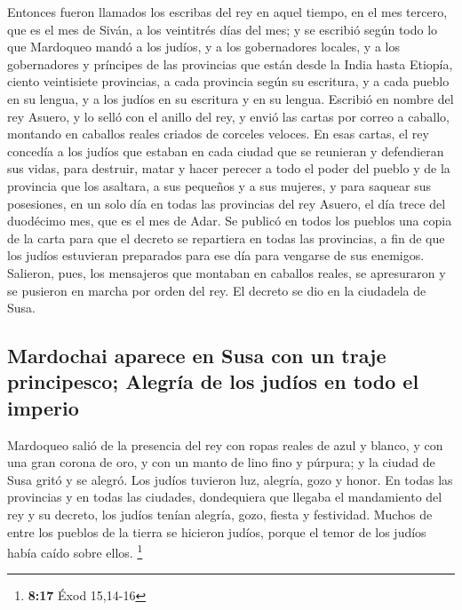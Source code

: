  Entonces fueron llamados los escribas del rey en aquel
tiempo, en el mes tercero, que es el mes de Siván, a los veintitrés días
del mes; y se escribió según todo lo que Mardoqueo mandó a los judíos, y
a los gobernadores locales, y a los gobernadores y príncipes de las
provincias que están desde la India hasta Etiopía, ciento veintisiete
provincias, a cada provincia según su escritura, y a cada pueblo en su
lengua, y a los judíos en su escritura y en su lengua. 
Escribió en nombre del rey Asuero, y lo selló con el anillo del rey, y
envió las cartas por correo a caballo, montando en caballos reales
criados de corceles veloces.  En esas cartas, el rey
concedía a los judíos que estaban en cada ciudad que se reunieran y
defendieran sus vidas, para destruir, matar y hacer perecer a todo el
poder del pueblo y de la provincia que los asaltara, a sus pequeños y a
sus mujeres, y para saquear sus posesiones,  en un solo
día en todas las provincias del rey Asuero, el día trece del duodécimo
mes, que es el mes de Adar.  Se publicó en todos los
pueblos una copia de la carta para que el decreto se repartiera en todas
las provincias, a fin de que los judíos estuvieran preparados para ese
día para vengarse de sus enemigos.  Salieron, pues, los
mensajeros que montaban en caballos reales, se apresuraron y se pusieron
en marcha por orden del rey. El decreto se dio en la ciudadela de Susa.

\hypertarget{mardochai-aparece-en-susa-con-un-traje-principesco-alegruxeda-de-los-juduxedos-en-todo-el-imperio}{%
\subsection{Mardochai aparece en Susa con un traje principesco; Alegría
de los judíos en todo el
imperio}\label{mardochai-aparece-en-susa-con-un-traje-principesco-alegruxeda-de-los-juduxedos-en-todo-el-imperio}}

 Mardoqueo salió de la presencia del rey con ropas reales
de azul y blanco, y con una gran corona de oro, y con un manto de lino
fino y púrpura; y la ciudad de Susa gritó y se alegró. 
Los judíos tuvieron luz, alegría, gozo y honor.  En todas
las provincias y en todas las ciudades, dondequiera que llegaba el
mandamiento del rey y su decreto, los judíos tenían alegría, gozo,
fiesta y festividad. Muchos de entre los pueblos de la tierra se
hicieron judíos, porque el temor de los judíos había caído sobre ellos.
\footnote{\textbf{8:17} Éxod 15,14-16}

